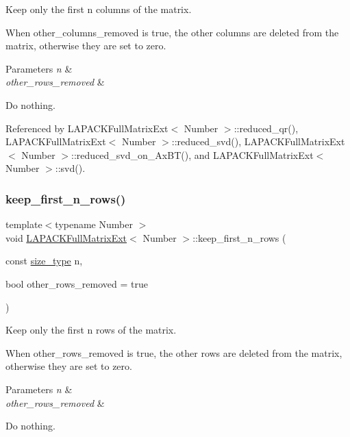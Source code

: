 Keep only the first n columns of the matrix.

When {\ttfamily other\+\_\+columns\+\_\+removed} is true, the other columns are deleted from the matrix, otherwise they are set to zero.


\begin{DoxyParams}{Parameters}
{\em n} & \\
\hline
{\em other\+\_\+rows\+\_\+removed} & \\
\hline
\end{DoxyParams}
Do nothing.

Referenced by L\+A\+P\+A\+C\+K\+Full\+Matrix\+Ext$<$ Number $>$\+::reduced\+\_\+qr(), L\+A\+P\+A\+C\+K\+Full\+Matrix\+Ext$<$ Number $>$\+::reduced\+\_\+svd(), L\+A\+P\+A\+C\+K\+Full\+Matrix\+Ext$<$ Number $>$\+::reduced\+\_\+svd\+\_\+on\+\_\+\+Ax\+B\+T(), and L\+A\+P\+A\+C\+K\+Full\+Matrix\+Ext$<$ Number $>$\+::svd().

\mbox{\label{classLAPACKFullMatrixExt_a6cb733ec47cbcb9fed535362616d7e07}} 
\subsubsection{\texorpdfstring{keep\+\_\+first\+\_\+n\+\_\+rows()}{keep\_first\_n\_rows()}}
{\footnotesize\ttfamily template$<$typename Number $>$ \\
void \hyperlink{classLAPACKFullMatrixExt}{L\+A\+P\+A\+C\+K\+Full\+Matrix\+Ext}$<$ Number $>$\+::keep\+\_\+first\+\_\+n\+\_\+rows (\begin{DoxyParamCaption}\item[{const \hyperlink{classLAPACKFullMatrixExt_a5cf5f4a6104dc17029210b5ca52bf574}{size\+\_\+type}}]{n,  }\item[{bool}]{other\+\_\+rows\+\_\+removed = {\ttfamily true} }\end{DoxyParamCaption})}

Keep only the first n rows of the matrix.

When {\ttfamily other\+\_\+rows\+\_\+removed} is true, the other rows are deleted from the matrix, otherwise they are set to zero.


\begin{DoxyParams}{Parameters}
{\em n} & \\
\hline
{\em other\+\_\+rows\+\_\+removed} & \\
\hline
\end{DoxyParams}
Do nothing.

